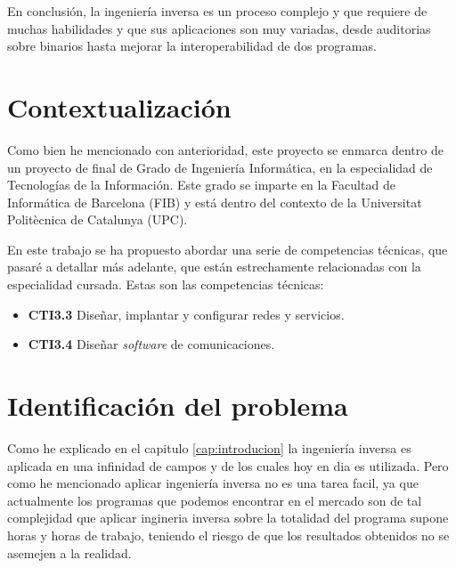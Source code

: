 En conclusión, la ingeniería inversa es un proceso complejo y que requiere de muchas habilidades y que sus aplicaciones son muy variadas, desde auditorias sobre binarios hasta mejorar 
la interoperabilidad de dos programas. 

\section{Contextualización}
\label{sec:contextualizacion}


Como bien he mencionado con anterioridad, este proyecto se enmarca dentro de un proyecto de final de Grado de Ingeniería Informática, en la especialidad de Tecnologías de la Información.
Este grado se imparte en la Facultad de Informática de Barcelona (FIB) y está dentro del contexto de la Universitat Politècnica de Catalunya (UPC).

En este trabajo se ha propuesto abordar una serie de competencias técnicas, que pasaré a detallar más adelante, que están estrechamente relacionadas con la especialidad cursada. Estas
son las competencias técnicas:

\begin{itemize}
    \item \textbf{CTI3.3} Diseñar, implantar y configurar redes y servicios.
    \item \textbf{CTI3.4} Diseñar \textit{software} de comunicaciones.
\end{itemize}

\section{Identificación del problema}
\label{sec:problema}

Como he explicado en el capitulo \ref{cap:introducion} la ingeniería inversa es aplicada en una infinidad de campos y de los cuales hoy en dia es utilizada. Pero como he mencionado
aplicar ingeniería inversa no es una tarea facil, ya que actualmente los programas que podemos encontrar en el mercado son de tal complejidad que aplicar ingineria inversa sobre la
totalidad del programa supone horas y horas de trabajo, teniendo el riesgo de que los resultados obtenidos no se asemejen a la realidad.

